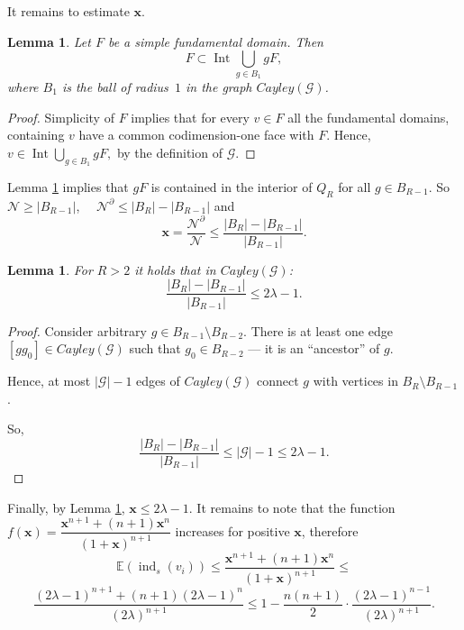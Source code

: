 \documentclass[12pt]{amsart}
\theoremstyle{plain}
\newtheorem{lemma}[theorem]{Lemma}
\theoremstyle{definition}
\theoremstyle{plain}
\theoremstyle{definition}
\renewcommand{\leq}{\leqslant}
\renewcommand{\geq}{\geqslant}
\DeclareMathOperator{\Int}{Int}
\DeclareMathOperator{\ind}{ind}
\begin{document}
It remains to estimate $\mathbf{x}$.


\begin{lemma}\label{LemmaInterior} Let $F$ be a simple fundamental domain. Then $$F\subset \Int \bigcup_{g \in B_1} gF,$$ where $B_1$ is the ball of radius~$1$ in the  graph $Cayley(\mathcal{G})$.

\end{lemma}

\begin{proof} Simplicity of $F$ implies that for every $v\in F$ all the fundamental domains, containing $v$ have a common codimension-one face with $F$. Hence, $v \in \Int \bigcup_{g \in B_1} gF,$ by the definition of $\mathcal{G}$.
\end{proof}


     Lemma \ref{LemmaInterior} implies that  $gF$ is contained  in the interior of $Q_R$ for all $g\in B_{R-1}$. So $\mathcal{N}\geq |B_{R-1}|$, \ \  $\mathcal{N}^{\partial}\leq |B_R| - |B_{R-1}|$ and $$\mathbf{x} = \dfrac{\mathcal{N}^\partial}{\mathcal{N}}\leq \dfrac{|B_R| - |B_{R-1}|}{|B_{R-1}|}.$$ 
    
    \begin{lemma}\label{lemmaNonAm} For $R>2$ it holds that in $Cayley(\mathcal{G})$:
    $$\dfrac{|B_R| - |B_{R-1}|}{|B_{R-1}|} \leq 2\lambda-1.$$ 
    
    \end{lemma}

    \begin{proof}
    Consider  arbitrary $g\in B_{R-1}\setminus B_{R-2}$. There is at least one edge $[g  g_0] \in Cayley(\mathcal{G})$ such that $g_0 \in B_{R-2}$ --- it is an ``ancestor'' of $g$. 
    

   

    Hence, at most $|\mathcal{G}| -1$ edges of $Cayley(\mathcal{G})$ connect $g$ with vertices in $B_R\setminus B_{R-1}$. 
    
    So, $$\dfrac{|B_R| - |B_{R-1}|}{|B_{R-1}|}\leq |\mathcal{G}|-1 \leq 2\lambda-1.$$
    
    \end{proof}
    Finally, by Lemma \ref{lemmaNonAm}, $\mathbf{x}\leq 2\lambda -1$. It remains to note that the function $f(\mathbf{x}) = \dfrac{\mathbf{x}^{n+1} + (n+1)\mathbf{x}^n}{(1+\mathbf{x})^{n+1}}$ increases for positive $\textbf{x}$, therefore $$\mathbb{E}(\ind_s(v_i)) \leq  \dfrac{\mathbf{x}^{n+1} + (n+1)\mathbf{x}^n}{(1+\mathbf{x})^{n+1}}\leq $$$$\dfrac{(2\lambda-1)^{n+1} + (n+1)(2\lambda-1)^n}{(2\lambda)^{n+1}}\leq 1 -\dfrac{n(n+1)}{2}\cdot \dfrac{(2\lambda-1)^{n-1}}{(2\lambda)^{n+1}}.$$
 
\end{document}
